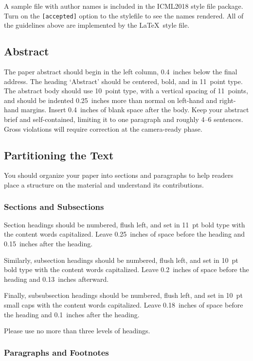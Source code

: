 \documentclass{article}
\begin{document}
A sample file with author names is included in the ICML2018 style file
package. Turn on the \texttt{[accepted]} option to the stylefile to
see the names rendered. All of the guidelines above are implemented
by the \LaTeX\ style file.

\subsection{Abstract}

The paper abstract should begin in the left column, 0.4~inches below the final
address. The heading `Abstract' should be centered, bold, and in 11~point type.
The abstract body should use 10~point type, with a vertical spacing of
11~points, and should be indented 0.25~inches more than normal on left-hand and
right-hand margins. Insert 0.4~inches of blank space after the body. Keep your
abstract brief and self-contained, limiting it to one paragraph and roughly 4--6
sentences. Gross violations will require correction at the camera-ready phase.

\subsection{Partitioning the Text}

You should organize your paper into sections and paragraphs to help
readers place a structure on the material and understand its
contributions.

\subsubsection{Sections and Subsections}

Section headings should be numbered, flush left, and set in 11~pt bold
type with the content words capitalized. Leave 0.25~inches of space
before the heading and 0.15~inches after the heading.

Similarly, subsection headings should be numbered, flush left, and set
in 10~pt bold type with the content words capitalized. Leave
0.2~inches of space before the heading and 0.13~inches afterward.

Finally, subsubsection headings should be numbered, flush left, and
set in 10~pt small caps with the content words capitalized. Leave
0.18~inches of space before the heading and 0.1~inches after the
heading.

Please use no more than three levels of headings.

\subsubsection{Paragraphs and Footnotes}
\end{document}
